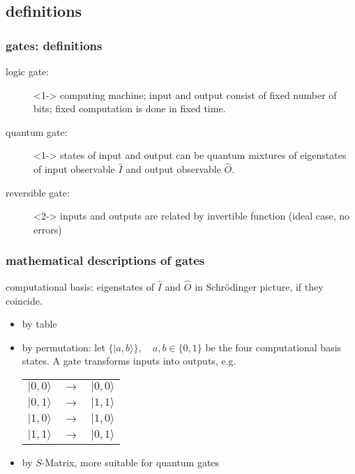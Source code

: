 \documentclass{beamer}
\begin{document}
\subsection{definitions}
\begin{frame}
	\frametitle{gates: definitions}
    \begin{description}
        \item[logic gate:]<1-> computing machine; input and output consist of fixed number of bits; fixed computation is done in fixed time.
        \item[quantum gate:]<1-> states of input and output can be quantum mixtures of eigenstates of input observable $\hat{I}$ and output observable $\hat{O}$.
		\item[reversible gate:]<2-> inputs and outputs are related by invertible function (ideal case, no errors)
	\end{description}
\end{frame}
%
\begin{frame}
	\frametitle{mathematical descriptions of gates}
	\begin{block}{computational basis:}
		eigenstates of $\hat{I}$ and $\hat{O}$ in Schr\"odinger picture, if they coincide.
	\end{block}
    \begin{itemize}
    \item by table
    \item by permutation: let $\{|a,b\rangle\},\quad a,b\in\{0,1\}$ be the four computational basis states. A gate transforms inputs into outputs, e.g.
        \begin{table}\label{XOR}
            \begin{tabular}{rcl}
                $|0,0\rangle$&$\to$&$|0,0\rangle$\\
                $|0,1\rangle$&$\to$&$|1,1\rangle$\\
                $|1,0\rangle$&$\to$&$|1,0\rangle$\\
                $|1,1\rangle$&$\to$&$|0,1\rangle$
            \end{tabular}
        \end{table}
    \item by $S$-Matrix, more suitable for quantum gates
    \end{itemize}
\end{frame}
\end{document}
